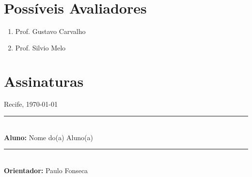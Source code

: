 \documentclass[12pt, a4paper, oneside]{article}
\newcommand{\studenttitle}{Aluno}
\newcommand{\student}{Nome do(a) Aluno(a)}
\newcommand{\advisertitle}{Orientador}
\newcommand{\adviser}{Paulo Fonseca}
\begin{document}
\clearpage
\nocite{*}



\clearpage
\section*{Possíveis Avaliadores}

\begin{enumerate}
\item Prof. Gustavo Carvalho
\item Prof. Silvio Melo
\end{enumerate}


\section*{Assinaturas}

\vfill
\begin{center}
	Recife, \today 

	\vspace{3cm}
	\rule{10cm}{.5pt}\\
	\textbf{\studenttitle:} \student\\

	\vspace{3cm}
	\rule{10cm}{.5pt}\\
	\textbf{\advisertitle:} \adviser\\
\end{center}
\vfill
\end{document}
